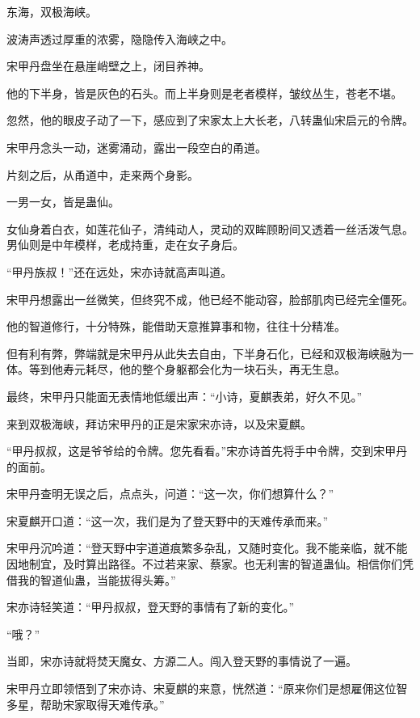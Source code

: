 
\begin{this_body}

东海，双极海峡。

波涛声透过厚重的浓雾，隐隐传入海峡之中。

宋甲丹盘坐在悬崖峭壁之上，闭目养神。

他的下半身，皆是灰色的石头。而上半身则是老者模样，皱纹丛生，苍老不堪。

忽然，他的眼皮子动了一下，感应到了宋家太上大长老，八转蛊仙宋启元的令牌。

宋甲丹念头一动，迷雾涌动，露出一段空白的甬道。

片刻之后，从甬道中，走来两个身影。

一男一女，皆是蛊仙。

女仙身着白衣，如莲花仙子，清纯动人，灵动的双眸顾盼间又透着一丝活泼气息。男仙则是中年模样，老成持重，走在女子身后。

“甲丹族叔！”还在远处，宋亦诗就高声叫道。

宋甲丹想露出一丝微笑，但终究不成，他已经不能动容，脸部肌肉已经完全僵死。

他的智道修行，十分特殊，能借助天意推算事和物，往往十分精准。

但有利有弊，弊端就是宋甲丹从此失去自由，下半身石化，已经和双极海峡融为一体。等到他寿元耗尽，他的整个身躯都会化为一块石头，再无生息。

最终，宋甲丹只能面无表情地低缓出声：“小诗，夏麒表弟，好久不见。”

来到双极海峡，拜访宋甲丹的正是宋家宋亦诗，以及宋夏麒。

“甲丹叔叔，这是爷爷给的令牌。您先看看。”宋亦诗首先将手中令牌，交到宋甲丹的面前。

宋甲丹查明无误之后，点点头，问道：“这一次，你们想算什么？”

宋夏麒开口道：“这一次，我们是为了登天野中的天难传承而来。”

宋甲丹沉吟道：“登天野中宇道道痕繁多杂乱，又随时变化。我不能亲临，就不能因地制宜，及时算出路径。不过若来家、蔡家。也无利害的智道蛊仙。相信你们凭借我的智道仙蛊，当能拔得头筹。”

宋亦诗轻笑道：“甲丹叔叔，登天野的事情有了新的变化。”

“哦？”

当即，宋亦诗就将焚天魔女、方源二人。闯入登天野的事情说了一遍。

宋甲丹立即领悟到了宋亦诗、宋夏麒的来意，恍然道：“原来你们是想雇佣这位智多星，帮助宋家取得天难传承。”


\end{this_body}
